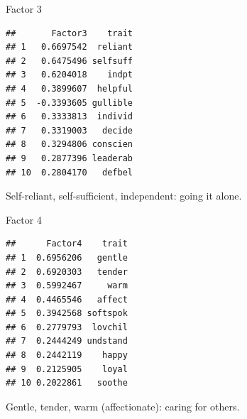 \documentclass[ignorenonframetext,]{beamer}
\newenvironment{Shaded}{\begin{snugshade}}{\end{snugshade}}
\newcommand{\DecValTok}[1]{\textcolor[rgb]{0.00,0.00,0.81}{#1}}
\newcommand{\KeywordTok}[1]{\textcolor[rgb]{0.13,0.29,0.53}{\textbf{#1}}}
\newcommand{\NormalTok}[1]{#1}
\newcommand{\OperatorTok}[1]{\textcolor[rgb]{0.81,0.36,0.00}{\textbf{#1}}}
\newcommand{\StringTok}[1]{\textcolor[rgb]{0.31,0.60,0.02}{#1}}
\begin{document}
\begin{frame}[fragile]{Factor 3}
\protect\hypertarget{factor-3}{}

\footnotesize

\begin{Shaded}
\end{Shaded}

\begin{verbatim}
##       Factor3    trait
## 1   0.6697542  reliant
## 2   0.6475496 selfsuff
## 3   0.6204018    indpt
## 4   0.3899607  helpful
## 5  -0.3393605 gullible
## 6   0.3333813  individ
## 7   0.3319003   decide
## 8   0.3294806 conscien
## 9   0.2877396 leaderab
## 10  0.2804170   defbel
\end{verbatim}

\normalsize

Self-reliant, self-sufficient, independent: going it alone.

\end{frame}

\begin{frame}[fragile]{Factor 4}
\protect\hypertarget{factor-4}{}

\footnotesize

\begin{Shaded}
\end{Shaded}

\begin{verbatim}
##      Factor4    trait
## 1  0.6956206   gentle
## 2  0.6920303   tender
## 3  0.5992467     warm
## 4  0.4465546   affect
## 5  0.3942568 softspok
## 6  0.2779793  lovchil
## 7  0.2444249 undstand
## 8  0.2442119    happy
## 9  0.2125905    loyal
## 10 0.2022861   soothe
\end{verbatim}

\normalsize

Gentle, tender, warm (affectionate): caring for others.

\end{frame}
\end{document}
